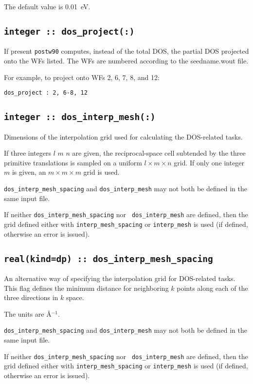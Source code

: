 The default value is 0.01~eV.

\subsection[dos\_project]{\tt integer :: dos\_project(:)}

If present {\tt postw90} computes, instead of the total DOS, the
partial DOS projected onto the WFs listed. The WFs are numbered
according to the seedname.wout file.

For example, to project onto WFs 2, 6, 7, 8, and 12:

{\tt dos\_project : 2, 6-8, 12}


\subsection[dos\_interp\_mesh]{\tt integer :: dos\_interp\_mesh(:)}
Dimensions of the interpolation grid used for calculating the DOS-related tasks.

If three integers $l$ $m$ $n$ are given, the reciprocal-space cell
subtended by the three primitive translations is sampled on a uniform
$l\times m\times n$ grid.  If only one integer $m$ is given, an
$m\times m\times m$ grid is used.

{\tt dos\_interp\_mesh\_spacing} and {\tt dos\_interp\_mesh} may not
both be defined in the same input file.

If neither {\tt dos\_interp\_mesh\_spacing} nor {\tt
  dos\_interp\_mesh} are defined, then the grid defined either with
{\tt interp\_mesh\_spacing} or {\tt interp\_mesh} is used (if defined,
otherwise an error is issued).

\subsection[dos\_interp\_mesh\_spacing]{\tt real(kind=dp) :: dos\_interp\_mesh\_spacing}
An alternative way of specifying the interpolation grid for
DOS-related tasks. This flag defines the minimum distance for
neighboring $k$ points along each of the three directions in $k$
space. 

The units are \AA$^{-1}$.

{\tt dos\_interp\_mesh\_spacing} and {\tt dos\_interp\_mesh} may
not both be defined in the same input file.

If neither {\tt dos\_interp\_mesh\_spacing} nor {\tt
  dos\_interp\_mesh} are defined, then the grid defined either with
{\tt interp\_mesh\_spacing} or {\tt interp\_mesh} is used (if defined,
otherwise an error is issued).


